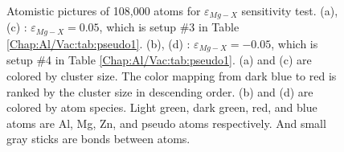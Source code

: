 \begin{figure}[!ht]
\caption[Atomistic pictures of 108,000 atoms for $\varepsilon_{Mg-X}$ sensitivity test.]{Atomistic pictures of 108,000 atoms for $\varepsilon_{Mg-X}$ sensitivity test. (a), (c) : $\varepsilon_{Mg-X} = 0.05$, which is setup \#3 in Table \ref{Chap:Al/Vac:tab:pseudo1}. (b), (d) : $\varepsilon_{Mg-X} = -0.05$, which is setup \#4 in Table \ref{Chap:Al/Vac:tab:pseudo1}. (a) and (c) are colored by cluster size. The color mapping from dark blue to red is ranked by the cluster size in descending order. (b) and (d) are colored by atom species. Light green, dark green, red, and blue atoms are Al, Mg, Zn, and pseudo atoms respectively. And small gray sticks are bonds between atoms.}
\label{Chap:Al/Vac:fig:sens_Mg}
\end{figure}
\endgroup

